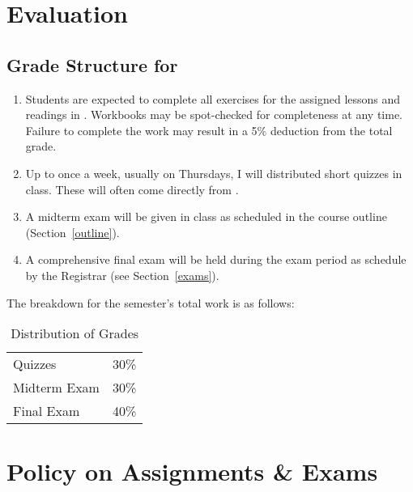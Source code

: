\documentclass[titlepage]{article}
\newcommand\policy{../policy}
\begin{document}
\section{Evaluation}
\label{evaluation}

\subsection{Grade Structure for \ccode}
\label{structure}

\begin{enumerate}
 \item
    Students are expected to complete all exercises for the assigned
    lessons and readings in \cite{bbh}. Workbooks may be spot-checked
    for completeness at any time. Failure to complete the work may
    result in a 5\% deduction from the total grade.
  \item
    Up to once a week, usually on Thursdays, I will distributed short
    quizzes in class. These will often come directly from \cite{bbh}.
 \item
   A midterm exam will be given in class as scheduled in the course
   outline (Section~\ref{outline}).
 \item
   A comprehensive final exam will be held during the exam period as
   schedule by the Registrar (see Section~\ref{exams}).
\end{enumerate}

The breakdown for the semester's total work is as follows:

\begin{table}[htbp]
  \centering
  {\lining
  \begin{tabular}{lr}
    \toprule
    Quizzes      & 30\% \\
    Midterm Exam & 30\% \\
    Final Exam   & 40\% \\
    \bottomrule
  \end{tabular}}
  \caption{Distribution of Grades}
  \label{distribution}
\end{table}



\section{Policy on Assignments \& Exams}
\label{policy}
\end{document}

